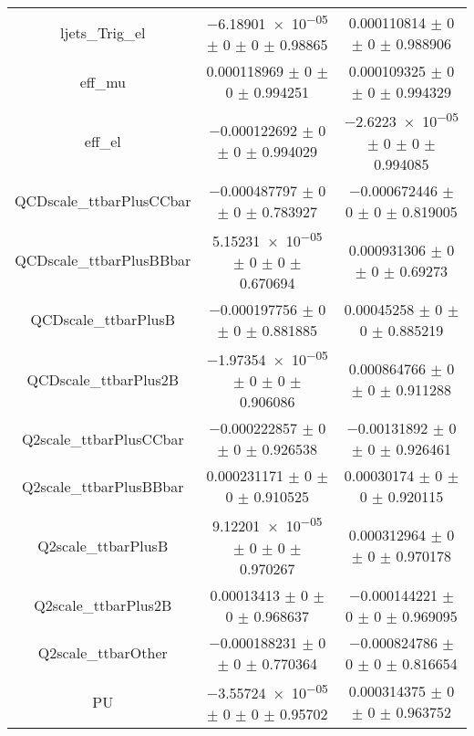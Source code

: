 \begin{table}
\begin{tabular}{ccc}
ljets\_Trig\_el 	& \num{-6.18901e-05} $\pm$ \num{0} $\pm$ \num{0} $\pm$ \num{0.98865} 	& \num{0.000110814} $\pm$ \num{0} $\pm$ \num{0} $\pm$ \num{0.988906}\\
eff\_mu 	& \num{0.000118969} $\pm$ \num{0} $\pm$ \num{0} $\pm$ \num{0.994251} 	& \num{0.000109325} $\pm$ \num{0} $\pm$ \num{0} $\pm$ \num{0.994329}\\
eff\_el 	& \num{-0.000122692} $\pm$ \num{0} $\pm$ \num{0} $\pm$ \num{0.994029} 	& \num{-2.6223e-05} $\pm$ \num{0} $\pm$ \num{0} $\pm$ \num{0.994085}\\
QCDscale\_ttbarPlusCCbar 	& \num{-0.000487797} $\pm$ \num{0} $\pm$ \num{0} $\pm$ \num{0.783927} 	& \num{-0.000672446} $\pm$ \num{0} $\pm$ \num{0} $\pm$ \num{0.819005}\\
QCDscale\_ttbarPlusBBbar 	& \num{5.15231e-05} $\pm$ \num{0} $\pm$ \num{0} $\pm$ \num{0.670694} 	& \num{0.000931306} $\pm$ \num{0} $\pm$ \num{0} $\pm$ \num{0.69273}\\
QCDscale\_ttbarPlusB 	& \num{-0.000197756} $\pm$ \num{0} $\pm$ \num{0} $\pm$ \num{0.881885} 	& \num{0.00045258} $\pm$ \num{0} $\pm$ \num{0} $\pm$ \num{0.885219}\\
QCDscale\_ttbarPlus2B 	& \num{-1.97354e-05} $\pm$ \num{0} $\pm$ \num{0} $\pm$ \num{0.906086} 	& \num{0.000864766} $\pm$ \num{0} $\pm$ \num{0} $\pm$ \num{0.911288}\\
Q2scale\_ttbarPlusCCbar 	& \num{-0.000222857} $\pm$ \num{0} $\pm$ \num{0} $\pm$ \num{0.926538} 	& \num{-0.00131892} $\pm$ \num{0} $\pm$ \num{0} $\pm$ \num{0.926461}\\
Q2scale\_ttbarPlusBBbar 	& \num{0.000231171} $\pm$ \num{0} $\pm$ \num{0} $\pm$ \num{0.910525} 	& \num{0.00030174} $\pm$ \num{0} $\pm$ \num{0} $\pm$ \num{0.920115}\\
Q2scale\_ttbarPlusB 	& \num{9.12201e-05} $\pm$ \num{0} $\pm$ \num{0} $\pm$ \num{0.970267} 	& \num{0.000312964} $\pm$ \num{0} $\pm$ \num{0} $\pm$ \num{0.970178}\\
Q2scale\_ttbarPlus2B 	& \num{0.00013413} $\pm$ \num{0} $\pm$ \num{0} $\pm$ \num{0.968637} 	& \num{-0.000144221} $\pm$ \num{0} $\pm$ \num{0} $\pm$ \num{0.969095}\\
Q2scale\_ttbarOther 	& \num{-0.000188231} $\pm$ \num{0} $\pm$ \num{0} $\pm$ \num{0.770364} 	& \num{-0.000824786} $\pm$ \num{0} $\pm$ \num{0} $\pm$ \num{0.816654}\\
PU 	& \num{-3.55724e-05} $\pm$ \num{0} $\pm$ \num{0} $\pm$ \num{0.95702} 	& \num{0.000314375} $\pm$ \num{0} $\pm$ \num{0} $\pm$ \num{0.963752}\\

\end{tabular}
\end{table}

